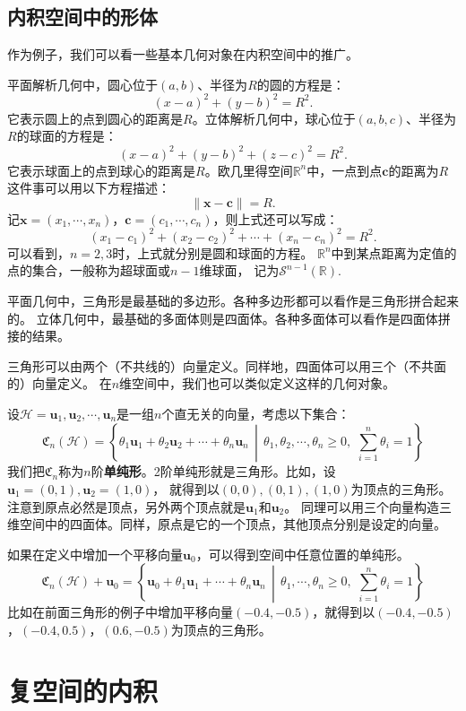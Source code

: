 \documentclass[12pt,UTF8]{ctexbook}
\begin{document}
\subsection{内积空间中的形体}
作为例子，我们可以看一些基本几何对象在内积空间中的推广。

平面解析几何中，圆心位于$(a,b)$、半径为$R$的圆的方程是：
$$ (x - a)^2 + (y - b)^2 = R^2.$$
它表示圆上的点到圆心的距离是$R$。立体解析几何中，球心位于$(a,b,c)$、半径为$R$的球面的方程是：
$$ (x - a)^2 + (y - b)^2 + (z - c)^2= R^2.$$
它表示球面上的点到球心的距离是$R$。欧几里得空间$\mathbb{R}^n$中，一点到点$\mathbf{c}$的距离为$R$这件事可以用以下方程描述：
$$ \| \mathbf{x} - \mathbf{c}\| = R. $$
记$\mathbf{x} = (x_1, \cdots , x_n)$，$\mathbf{c} = (c_1, \cdots , c_n)$，则上式还可以写成：
$$ (x_1 - c_1)^2 + (x_2 - c_2)^2 + \cdots + (x_n - c_n)^2 = R^2.$$
可以看到，$n=2,3$时，上式就分别是圆和球面的方程。
$\mathbb{R}^n$中到某点距离为定值的点的集合，一般称为超球面或$n-1$维球面，
记为$\mathcal{S}^{n-1}(\mathbb{R})$.

平面几何中，三角形是最基础的多边形。各种多边形都可以看作是三角形拼合起来的。
立体几何中，最基础的多面体则是四面体。各种多面体可以看作是四面体拼接的结果。

三角形可以由两个（不共线的）向量定义。同样地，四面体可以用三个（不共面的）向量定义。
在$n$维空间中，我们也可以类似定义这样的几何对象。

设$\mathcal{H} = \mathbf{u}_1, \mathbf{u}_2, \cdots , \mathbf{u}_n$是一组$n$个直无关的向量，考虑以下集合：
$$ \mathfrak{C}_n (\mathcal{H}) = \left\{ \theta_1\mathbf{u}_1 + \theta_2\mathbf{u}_2 + \cdots + \theta_n\mathbf{u}_n \, \middle\vert \, \theta_1, \theta_2, \cdots, \theta_n \geqslant 0, \,\, \sum_{i=1}^n \theta_i = 1 \right\}$$
我们把$\mathfrak{C}_n$称为$n$阶\textbf{单纯形}。2阶单纯形就是三角形。比如，设$\mathbf{u}_1 =(0,1), \mathbf{u}_2 = (1,0)$，
就得到以$(0,0), (0,1), (1,0)$为顶点的三角形。注意到原点必然是顶点，另外两个顶点就是$\mathbf{u}_1$和$\mathbf{u}_2$。
同理可以用三个向量构造三维空间中的四面体。同样，原点是它的一个顶点，其他顶点分别是设定的向量。

如果在定义中增加一个平移向量$\mathbf{u}_0$，可以得到空间中任意位置的单纯形。
$$ \mathfrak{C}_n (\mathcal{H}) + \mathbf{u}_0 = \left\{ \mathbf{u}_0 + \theta_1\mathbf{u}_1 +  \cdots + \theta_n\mathbf{u}_n \, \middle\vert \, \theta_1,  \cdots, \theta_n \geqslant 0, \,\, \sum_{i=1}^n \theta_i = 1 \right\}$$
比如在前面三角形的例子中增加平移向量$(-0.4, -0.5)$，就得到以$(-0.4, -0.5)$，$(-0.4, 0.5)$，$(0.6, -0.5)$为顶点的三角形。

\section{复空间的内积}
\end{document}
